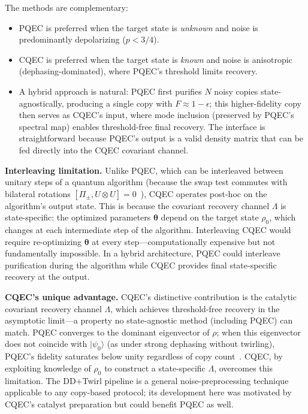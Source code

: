 \documentclass[a4paper,twocolumn]{quantumarticle}
\begin{document}
The methods are complementary:
\begin{itemize}
\item PQEC is preferred when the target state is \emph{unknown} and noise is predominantly depolarizing ($p < 3/4$).
\item CQEC is preferred when the target state is \emph{known} and noise is anisotropic (dephasing-dominated), where PQEC's threshold limits recovery.
\item A hybrid approach is natural: PQEC first purifies $N$ noisy copies state-agnostically, producing a single copy with $F \approx 1 - \epsilon$; this higher-fidelity copy then serves as CQEC's input, where mode inclusion (preserved by PQEC's spectral map) enables threshold-free final recovery.
The interface is straightforward because PQEC's output is a valid density matrix that can be fed directly into the CQEC covariant channel.
\end{itemize}

\textbf{Interleaving limitation.}
Unlike PQEC, which can be interleaved between unitary steps of a quantum algorithm (because the swap test commutes with bilateral rotations $[\Pi_\pm, U \otimes U] = 0$~\cite{Raghoonanan2026}), CQEC operates post-hoc on the algorithm's output state.
This is because the covariant recovery channel $\Lambda$ is state-specific: the optimized parameters $\boldsymbol{\theta}$ depend on the target state $\rho_0$, which changes at each intermediate step of the algorithm.
Interleaving CQEC would require re-optimizing $\boldsymbol{\theta}$ at every step---computationally expensive but not fundamentally impossible.
In a hybrid architecture, PQEC could interleave purification during the algorithm while CQEC provides final state-specific recovery at the output.

\textbf{CQEC's unique advantage.}
CQEC's distinctive contribution is the catalytic covariant recovery channel $\Lambda$, which achieves threshold-free recovery in the asymptotic limit---a property no state-agnostic method (including PQEC) can match.
PQEC converges to the dominant eigenvector of $\rho$; when this eigenvector does not coincide with $|\psi_0\rangle$ (as under strong dephasing without twirling), PQEC's fidelity saturates below unity regardless of copy count~\cite{Raghoonanan2026}.
CQEC, by exploiting knowledge of $\rho_0$ to construct a state-specific $\Lambda$, overcomes this limitation.
The DD+Twirl pipeline is a general noise-preprocessing technique applicable to any copy-based protocol; its development here was motivated by CQEC's catalyst preparation but could benefit PQEC as well.
\end{document}
